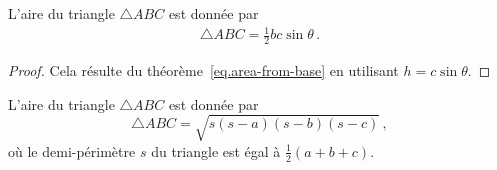 \vspace{0.4cm}




\begin{theorem} L'aire du triangle $\triangle ABC$ est donnée par 
\begin{align}\label{eq.area-from-sine}
\triangle ABC = \frac{1}{2}bc\sin \theta\,.
\end{align}
\end{theorem}
\begin{proof} Cela résulte du  théorème~\ref{eq.area-from-base} en utilisant 
$h=c\sin \theta$.
\end{proof}




\begin{theorem}[Héron] L'aire du triangle $\triangle ABC$ est donnée par \label{thm.heron} 
\[
\triangle ABC = \sqrt{s(s-a)(s-b)(s-c)}\,,
\]
où  le demi-périmètre $s$ du triangle est égal à $\frac{1}{2}(a+b+c)$.
\end{theorem}

